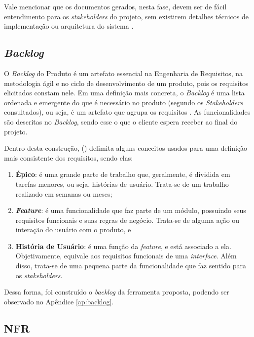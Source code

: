 Vale mencionar que os documentos gerados, nesta fase, devem ser de fácil entendimento para os \textit{stakeholders} do projeto, sem existirem detalhes técnicos de implementação ou arquitetura do sistema \cite{Sommerville10}.

\subsection{\textit{Backlog}}

\label{sec:backlog}

O \textit{Backlog} do Produto é um artefato essencial na Engenharia de Requisitos, na metodologia ágil e no ciclo de desenvolvimento de um produto, pois os requisitos elicitados constam nele. Em uma definição mais concreta, o \textit{Backlog} é uma lista ordenada e emergente do que é necessário no produto (segundo os \textit{Stakeholders} consultados), ou seja, é um artefato que agrupa os requisitos \cite{carolipaulo2021}. As funcionalidades são descritas no \textit{Backlog}, sendo esse o que o cliente espera receber ao final do projeto.

Dentro desta construção,  (\citeyear{carolipaulo2021}) delimita alguns conceitos usados para uma definição mais consistente dos requisitos, sendo elas:

\begin{enumerate}
    \item \label{tp:epico} \textbf{Épico}: é uma grande parte de trabalho que, geralmente, é dividida em tarefas menores, ou seja, histórias de usuário. Trata-se de um trabalho realizado em semanas ou meses;
    \item \label{tp:feature} \textit{\textbf{Feature}}: é uma funcionalidade que faz parte de um módulo, possuindo seus requisitos funcionais e suas regras de negócio. Trata-se de alguma ação ou interação do usuário com o produto, e
    \item \label{tp:us} \textbf{História de Usuário}: é uma função da \textit{feature}, e está associado a ela. Objetivamente, equivale aos requisitos funcionais de uma \textit{interface}. Além disso, trata-se de uma pequena parte da funcionalidade que faz sentido para os \textit{stakeholders}.
\end{enumerate}

Dessa forma, foi construído o \textit{backlog} da ferramenta proposta, podendo ser observado no Apêndice \ref{ap:backlog}.

\subsection{NFR}


